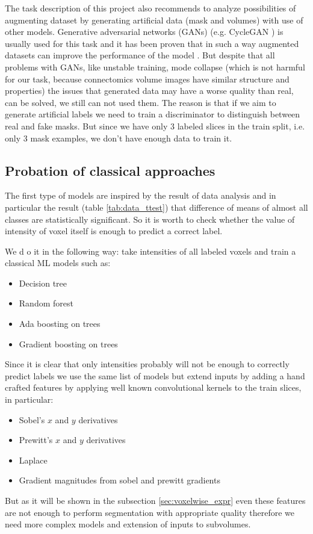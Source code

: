 \documentclass[twocolumn, a4paper]{article}
\theoremstyle{definition}
\begin{document}
The task description \cite{proj_tasks} of this project also recommends to analyze possibilities of augmenting dataset
by generating artificial data (mask and volumes) with use of other models. Generative adversarial networks
(GANs) (e.g. CycleGAN \cite{zhu2017unpaired}) is usually used for this task and it has been proven that in such a way
augmented datasets can improve the performance of the model \cite{shumilo2023generative,sandfort2019data}.
But despite that all problems with GANs, like
unstable training, mode collapse (which is not harmful for our task, because connectomics
volume images have similar structure and properties) the issues that generated data
may have a worse quality than real, can be solved, we still can not used them.
The reason is that if we aim to generate artificial labels we need to train a discriminator to
distinguish between real and fake masks. But since we have only 3 labeled slices in the train split,
i.e. only 3 mask examples, we don't have enough data to train it.

\subsection{Probation of classical approaches}
The first type of models are inspired by the result of data analysis and in particular the result
(table \ref{tab:data_ttest}) that difference of means of almost all classes are statistically significant.
So it is worth to check whether the value of intensity of voxel itself is enough to predict a correct label.

We d o it in the following way: take intensities of all labeled voxels and train a
classical ML models such as:
\begin{itemize}
    \itemsep0em
    \item Decision tree \cite{breiman2017classification}
    \item Random forest \cite{breiman2001random}
    \item Ada boosting on trees \cite{hastie2009multi}
    \item Gradient boosting on trees \cite{friedman2001greedy}
\end{itemize}
Since it is clear that only intensities probably will not be enough to correctly predict
labels we use the same list of models but extend inputs by adding a hand crafted features by
applying well known convolutional kernels to the train slices, in particular:
\begin{itemize}
    \itemsep0em
    \item Sobel's \(x \) and \(y\) derivatives
    \item Prewitt's \(x \) and \(y\) derivatives
    \item Laplace
    \item Gradient magnitudes from sobel and prewitt gradients
\end{itemize}
But as it will be shown in the subsection \ref{sec:voxelwise_expr} even these features are
not enough to perform segmentation with appropriate quality therefore we need more complex models
and extension of inputs to subvolumes.
\end{document}
